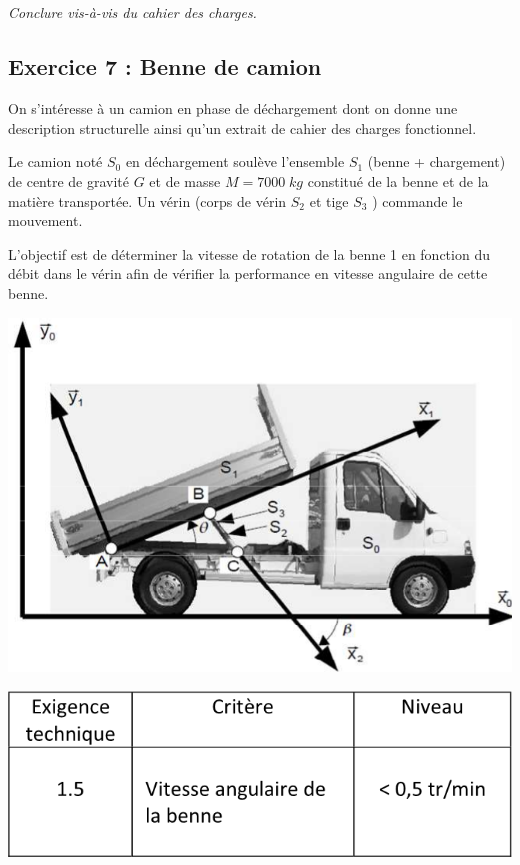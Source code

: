 \documentclass[10pt,fleqn]{article} %
\begin{document}
\begin{multicols}{2}
\subparagraph{}
\textit{Conclure vis-à-vis du cahier des charges.}
\ifprof
\begin{corrige}
\end{corrige}
\else
\fi


\subsection*{Exercice 7 : Benne de camion}
\setcounter{exo}{0}

On s’intéresse à un camion en phase de déchargement dont on donne une description structurelle ainsi qu’un extrait de cahier des charges fonctionnel.  

Le camion noté $S_0$ en déchargement soulève l'ensemble $S_1$ (benne + chargement) de centre de gravité $G$ et de masse $M = 7000\; kg$ constitué de la benne et de la matière transportée. Un vérin (corps de vérin $S_2$ et tige $S_3$ ) commande le mouvement. 

L’objectif est de déterminer la vitesse de rotation de la benne 1 en fonction du débit dans le vérin afin de vérifier la performance en vitesse angulaire de cette benne. 

\begin{center}
\includegraphics[width=.9\linewidth]{images/Fig07_01}

\includegraphics[width=.9\linewidth]{images/Fig07_02}
\end{center}


\end{multicols}
\end{document}
